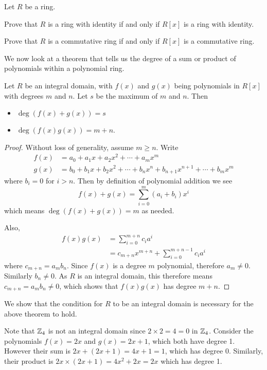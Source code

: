 \begin{exercise}\label{exercise-commutative-ring-with-identity-iff-polynomial-ring-is-also}
    Let $R$ be a ring.
    \begin{partquestions}{\alph*}
        \item Prove that $R$ is a ring with identity if and only if $R[x]$ is a ring with identity.
        \item Prove that $R$ is a commutative ring if and only if $R[x]$ is a commutative ring.
    \end{partquestions}
\end{exercise}

We now look at a theorem that tells us the degree of a sum or product of polynomials within a polynomial ring.
\begin{theorem}\label{thrm-polynomial-degree-properties}
    Let $R$ be an integral domain, with $f(x)$ and $g(x)$ being polynomials in $R[x]$ with degrees $m$ and $n$. Let $s$ be the maximum of $m$ and $n$. Then
    \begin{itemize}
        \item $\deg(f(x) + g(x)) = s$
        \item $\deg(f(x)g(x)) = m + n$.
    \end{itemize}
\end{theorem}
\begin{proof}
    Without loss of generality, assume $m \geq n$. Write
    \begin{align*}
        f(x) &= a_0 + a_1x + a_2x^2 + \cdots + a_mx^m\\
        g(x) &= b_0 + b_1x + b_2x^2 + \cdots + b_nx^n + b_{n+1}x^{n+1} + \cdots + b_mx^m
    \end{align*}
    where $b_i = 0$ for $i > n$. Then by definition of polynomial addition we see
    \[
        f(x) + g(x) = \sum_{i=0}^m(a_i+b_i)x^i
    \]
    which means $\deg(f(x) + g(x)) = m$ as needed.

    Also,
    \begin{align*}
        f(x)g(x) &= \sum_{i=0}^{m+n}c_ia^i\\
        &= c_{m+n}x^{m+n} + \sum_{i=0}^{m+n-1}c_ia^i
    \end{align*}
    where $c_{m+n} = a_mb_n$. Since $f(x)$ is a degree $m$ polynomial, therefore $a_m \neq 0$. Similarly $b_n \neq 0$. As $R$ is an integral domain, this therefore means $c_{m+n} = a_mb_n \neq 0$, which shows that $f(x)g(x)$ has degree $m + n$.
\end{proof}
\begin{example}
    We show that the condition for $R$ to be an integral domain is necessary for the above theorem to hold.

    Note that $\mathbb{Z}_4$ is not an integral domain since $2 \times 2 = 4 = 0$ in $\mathbb{Z}_4$. Consider the polynomials $f(x) = 2x$ and $g(x) = 2x + 1$, which both have degree 1. However their sum is $2x + (2x + 1) = 4x + 1= 1$, which has degree 0. Similarly, their product is $2x \times (2x+1) = 4x^2 + 2x = 2x$ which has degree 1.
\end{example}

